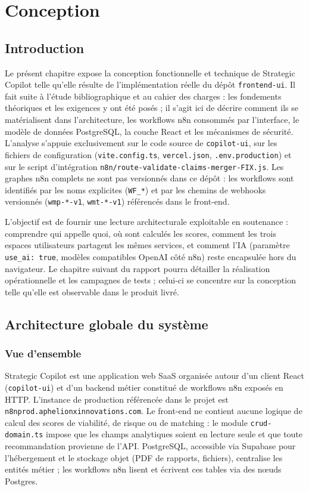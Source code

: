 \chapter{Conception}

\section{Introduction}

Le présent chapitre expose la conception fonctionnelle et technique de Strategic Copilot telle qu'elle résulte de l'implémentation réelle du dépôt \texttt{frontend-ui}. Il fait suite à l'étude bibliographique et au cahier des charges : les fondements théoriques et les exigences y ont été posés ; il s'agit ici de décrire comment ils se matérialisent dans l'architecture, les workflows n8n consommés par l'interface, le modèle de données PostgreSQL, la couche React et les mécanismes de sécurité. L'analyse s'appuie exclusivement sur le code source de \texttt{copilot-ui}, sur les fichiers de configuration (\texttt{vite.config.ts}, \texttt{vercel.json}, \texttt{.env.production}) et sur le script d'intégration \texttt{n8n/route-validate-claims-merger-FIX.js}. Les graphes n8n complets ne sont pas versionnés dans ce dépôt : les workflows sont identifiés par les noms explicites (\texttt{WF\_*}) et par les chemins de webhooks versionnés (\texttt{wmp-*-v1}, \texttt{wmt-*-v1}) référencés dans le front-end.

L'objectif est de fournir une lecture architecturale exploitable en soutenance : comprendre qui appelle quoi, où sont calculés les scores, comment les trois espaces utilisateurs partagent les mêmes services, et comment l'IA (paramètre \texttt{use\_ai: true}, modèles compatibles OpenAI côté n8n) reste encapsulée hors du navigateur. Le chapitre suivant du rapport pourra détailler la réalisation opérationnelle et les campagnes de tests ; celui-ci se concentre sur la conception telle qu'elle est observable dans le produit livré.

\section{Architecture globale du système}

\subsection{Vue d'ensemble}

Strategic Copilot est une application web SaaS organisée autour d'un client React (\texttt{copilot-ui}) et d'un backend métier constitué de workflows n8n exposés en HTTP. L'instance de production référencée dans le projet est \texttt{n8nprod.aphelionxinnovations.com}. Le front-end ne contient aucune logique de calcul des scores de viabilité, de risque ou de matching : le module \texttt{crud-domain.ts} impose que les champs analytiques soient en lecture seule et que toute recommandation provienne de l'API. PostgreSQL, accessible via Supabase pour l'hébergement et le stockage objet (PDF de rapports, fichiers), centralise les entités métier ; les workflows n8n lisent et écrivent ces tables via des nœuds Postgres.

